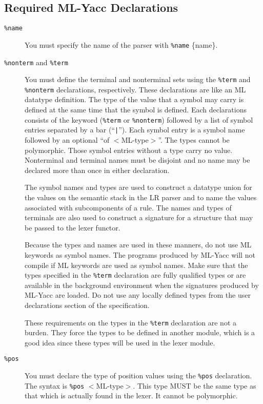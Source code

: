 \documentclass{article}
\begin{document}
\subsection{Required ML-Yacc Declarations}
\begin{description}
\item[{\tt \%name}]
You must specify the name of the parser with {\tt \%name} \{name\}.
\item[{\tt \%nonterm} and {\tt \%term}]
You must define the terminal and nonterminal sets using the 
{\tt \%term} and {\tt \%nonterm}
declarations, respectively.  These declarations are like an ML datatype
definition.
The type of the value that a symbol may carry is defined at the same time
that the symbol is defined.  Each declarations consists of the keyword
({\tt \%term} or {\tt \%nonterm})
followed by a list of symbol entries separated by a bar (``{\tt |}'').
Each symbol entry is a symbol name followed by an optional 
``of \/ $<$ML-type$>$''. The types cannot be polymorphic.
Those symbol entries without a type carry no value.
Nonterminal and terminal names must be disjoint and no name may be declared
more than once in either declaration.

The symbol names and types are used to construct a datatype union for the
values on the semantic stack in the LR parser and to name the values
associated with subcomponents of a rule.  The names and types of 
terminals are also used to construct a signature for a structure that
may be passed to the lexer functor.

Because the types and names are used in these manners, do
not use ML keywords as symbol names.   The programs produced by ML-Yacc
will not compile if ML keywords are used as symbol names.  
Make sure that the types specified in the {\tt \%term} declaration are
fully qualified types or are available in the background
environment when the signatures produced by ML-Yacc are loaded.  Do
not use any locally defined types from the user declarations section of
the specification.

These requirements on the types in the {\tt \%term} declaration are not
a burden.
They force the types to be defined in another module,
which is a good idea since these types will
be used in the lexer module.
\item[{\tt \%pos}]
You must declare the type of position values using the {\tt \%pos} declaration.
The syntax is {\tt \%pos} $<$ML-type$>$.
This type MUST be the same type as that which is actually found in the lexer.
It cannot be polymorphic.

\end{description}
\end{document}
